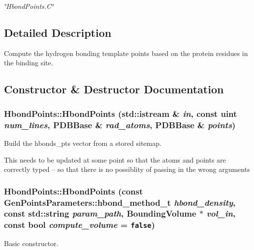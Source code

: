 \begin{CompactItemize}
\begin{CompactList}\small\item\em \char`\"{}Hbond\-Points.C\char`\"{} \item\end{CompactList}\end{CompactItemize}


\subsection{Detailed Description}
Compute the hydrogen bonding template points based on the protein residues in the binding site. 



\subsection{Constructor \& Destructor Documentation}
\subsubsection{\setlength{\rightskip}{0pt plus 5cm}Hbond\-Points::Hbond\-Points (std::istream \& {\em in}, const uint {\em num\_\-lines}, \bf{PDBBase} \& {\em rad\_\-atoms}, \bf{PDBBase} \& {\em points})}\label{classSimSite3D_1_1HbondPoints_da198374071ef598a898466343ca4d17}


Build the hbonds\_\-pts vector from a stored sitemap. 

This needs to be updated at some point so that the atoms and points are correctly typed -- so that there is no possiblity of passing in the wrong arguments 
\subsubsection{\setlength{\rightskip}{0pt plus 5cm}Hbond\-Points::Hbond\-Points (const \bf{Gen\-Points\-Parameters::hbond\_\-method\_\-t} {\em hbond\_\-density}, const std::string {\em param\_\-path}, \bf{Bounding\-Volume} $\ast$ {\em vol\_\-in}, const bool {\em compute\_\-volume} = {\tt false})}\label{classSimSite3D_1_1HbondPoints_ffcbf1d30cd9190ad924c5a263f387c6}


Basic constructor. 

